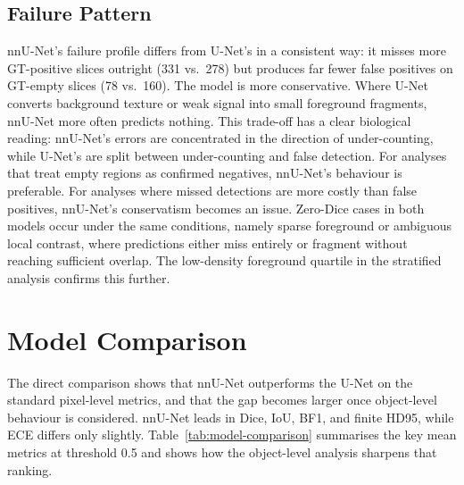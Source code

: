 \documentclass[logo,bsc,singlespacing,parskip,online]{infthesis}
\begin{document}
\subsection{Failure Pattern}
nnU-Net's failure profile differs from U-Net's in a consistent way: it misses
more GT-positive slices outright (331 vs.\ 278) but produces far fewer false
positives on GT-empty slices (78 vs.\ 160). The model is more conservative.
Where U-Net converts background texture or weak signal into small foreground
fragments, nnU-Net more often predicts nothing. This trade-off has a clear
biological reading: nnU-Net's errors are concentrated in the direction of
under-counting, while U-Net's are split between under-counting and false
detection. For analyses that treat empty regions as confirmed negatives,
nnU-Net's behaviour is preferable. For analyses where missed detections are
more costly than false positives, nnU-Net's conservatism becomes an issue. 
Zero-Dice cases in both models occur under the same conditions, namely sparse
foreground or ambiguous local contrast, where predictions either miss entirely
or fragment without reaching sufficient overlap. The
low-density foreground quartile in the stratified analysis confirms this further.


\section{Model Comparison}
\label{sec:comparison}

The direct comparison shows that nnU-Net outperforms the U-Net on the standard pixel-level
metrics, and that the gap becomes larger once object-level behaviour is considered.
nnU-Net leads in Dice, IoU, BF1, and finite HD95, while ECE differs only
slightly. Table~\ref{tab:model-comparison} summarises the key mean metrics at
threshold 0.5 and shows how the object-level analysis sharpens that ranking.
\end{document}
